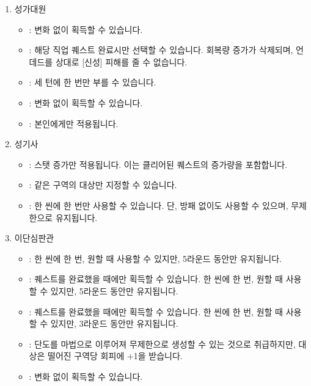 \documentclass{report}
\begin{document}
		\begin{enumerate}
			\item 성가대원
				\begin{itemize}
					\item {}: 변화 없이 획득할 수 있습니다.
					\item {}: 해당 직업 퀘스트 완료시만 선택할 수 있습니다. 회복량 증가가 삭제되며, 언데드를 상대로 [신성] 피해를 줄 수 없습니다.
					\item {}: 세 턴에 한 번만 부를 수 있습니다.
					\item {}: 변화 없이 획득할 수 있습니다.
					\item {}: 본인에게만 적용됩니다.
				\end{itemize}
			\item 성기사
				\begin{itemize}
					\item {}: 스탯 증가만 적용됩니다. 이는 클리어된 퀘스트의 증가량을 포함합니다.
					\item {}: 같은 구역의 대상만 지정할 수 있습니다.
					\item {}: 한 씬에 한 번만 사용할 수 있습니다. 단, 방패 없이도 사용할 수 있으며, 무제한으로 유지됩니다.
				\end{itemize}
			\item 이단심판관
				\begin{itemize}
					\item {}: 한 씬에 한 번, 원할 때 사용할 수 있지만, 5라운드 동안만 유지됩니다.
					\item {}: 퀘스트를 완료했을 때에만 획득할 수 있습니다. 한 씬에 한 번, 원할 때 사용할 수 있지만, 5라운드 동안만 유지됩니다.
					\item {}: 퀘스트를 완료했을 때에만 획득할 수 있습니다. 한 씬에 한 번, 원할 때 사용할 수 있지만, 3라운드 동안만 유지됩니다.
					\item {}: 단도를 마법으로 이루어져 무제한으로 생성할 수 있는 것으로 취급하지만, 대상은 떨어진 구역당 회피에 +1을 받습니다.
					\item {}: 변화 없이 획득할 수 있습니다.
				\end{itemize}
		\end{enumerate}
	
\end{document}
